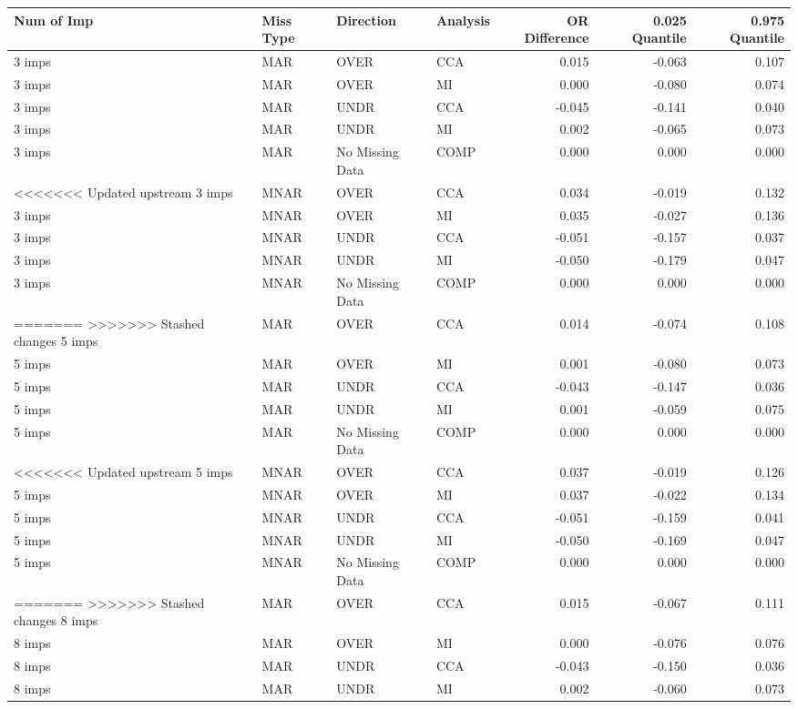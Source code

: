 \documentclass[
  letterpaper,
  DIV=11,
  numbers=noendperiod]{scrartcl}
\begin{document}
\begin{tabular}[t]{llllrrr}
\toprule
Num of Imp & Miss Type & Direction & Analysis & OR Difference & 0.025 Quantile & 0.975 Quantile\\
\midrule
3 imps & MAR & OVER & CCA & 0.015 & -0.063 & 0.107\\
3 imps & MAR & OVER & MI & 0.000 & -0.080 & 0.074\\
3 imps & MAR & UNDR & CCA & -0.045 & -0.141 & 0.040\\
3 imps & MAR & UNDR & MI & 0.002 & -0.065 & 0.073\\
3 imps & MAR & No Missing Data & COMP & 0.000 & 0.000 & 0.000\\
\addlinespace
<<<<<<< Updated upstream
3 imps & MNAR & OVER & CCA & 0.034 & -0.019 & 0.132\\
3 imps & MNAR & OVER & MI & 0.035 & -0.027 & 0.136\\
3 imps & MNAR & UNDR & CCA & -0.051 & -0.157 & 0.037\\
3 imps & MNAR & UNDR & MI & -0.050 & -0.179 & 0.047\\
3 imps & MNAR & No Missing Data & COMP & 0.000 & 0.000 & 0.000\\
\addlinespace
=======
>>>>>>> Stashed changes
5 imps & MAR & OVER & CCA & 0.014 & -0.074 & 0.108\\
5 imps & MAR & OVER & MI & 0.001 & -0.080 & 0.073\\
5 imps & MAR & UNDR & CCA & -0.043 & -0.147 & 0.036\\
5 imps & MAR & UNDR & MI & 0.001 & -0.059 & 0.075\\
5 imps & MAR & No Missing Data & COMP & 0.000 & 0.000 & 0.000\\
\addlinespace
<<<<<<< Updated upstream
5 imps & MNAR & OVER & CCA & 0.037 & -0.019 & 0.126\\
5 imps & MNAR & OVER & MI & 0.037 & -0.022 & 0.134\\
5 imps & MNAR & UNDR & CCA & -0.051 & -0.159 & 0.041\\
5 imps & MNAR & UNDR & MI & -0.050 & -0.169 & 0.047\\
5 imps & MNAR & No Missing Data & COMP & 0.000 & 0.000 & 0.000\\
\addlinespace
=======
>>>>>>> Stashed changes
8 imps & MAR & OVER & CCA & 0.015 & -0.067 & 0.111\\
8 imps & MAR & OVER & MI & 0.000 & -0.076 & 0.076\\
8 imps & MAR & UNDR & CCA & -0.043 & -0.150 & 0.036\\
8 imps & MAR & UNDR & MI & 0.002 & -0.060 & 0.073\\

\end{tabular}
\end{document}
